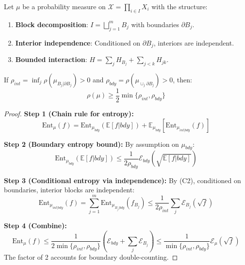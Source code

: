 \begin{theorem}
\label{thm:cond_tensor}
Let $\mu$ be a probability measure on $\mathcal{X} = \prod_{i \in I} X_i$ with the structure:
\begin{enumerate}
\item[(C1)] \textbf{Block decomposition}: $I = \bigsqcup_{j=1}^m B_j$ with boundaries $\partial B_j$.
\item[(C2)] \textbf{Interior independence}: Conditioned on $\partial B_j$, interiors are independent.
\item[(C3)] \textbf{Bounded interaction}: $H = \sum_j H_{B_j} + \sum_{j<k} H_{jk}$.
\end{enumerate}
If $\rho_{int} = \inf_j \rho(\mu_{B_j|\partial B_j}) > 0$ and $\rho_{bdy} = \rho(\mu_{\cup_j \partial B_j}) > 0$, then:
\begin{equation}
\rho(\mu) \geq \frac{1}{2} \min\{\rho_{int}, \rho_{bdy}\}
\end{equation}
\end{theorem}

\begin{proof}
\textbf{Step 1 (Chain rule for entropy):}
\begin{equation}
\mathrm{Ent}_\mu(f) = \mathrm{Ent}_{\mu_{bdy}}(\mathbb{E}[f|bdy]) + \mathbb{E}_{\mu_{bdy}}[\mathrm{Ent}_{\mu_{int|bdy}}(f)]
\end{equation}

\textbf{Step 2 (Boundary entropy bound):}
By assumption on $\mu_{bdy}$:
\begin{equation}
\mathrm{Ent}_{\mu_{bdy}}(\mathbb{E}[f|bdy]) \leq \frac{1}{2\rho_{bdy}} \mathcal{E}_{bdy}(\sqrt{\mathbb{E}[f|bdy]})
\end{equation}

\textbf{Step 3 (Conditional entropy via independence):}
By (C2), conditioned on boundaries, interior blocks are independent:
\begin{equation}
\mathrm{Ent}_{\mu_{int|bdy}}(f) = \sum_{j=1}^m \mathrm{Ent}_{\mu_{B_j|bdy}}(f_{B_j}) \leq \frac{1}{2\rho_{int}} \sum_j \mathcal{E}_{B_j}(\sqrt{f})
\end{equation}

\textbf{Step 4 (Combine):}
\begin{equation}
\mathrm{Ent}_\mu(f) \leq \frac{1}{2\min\{\rho_{int}, \rho_{bdy}\}} \left(\mathcal{E}_{bdy} + \sum_j \mathcal{E}_{B_j}\right) \leq \frac{1}{\min\{\rho_{int}, \rho_{bdy}\}} \mathcal{E}_\mu(\sqrt{f})
\end{equation}
The factor of 2 accounts for boundary double-counting.
\end{proof}

